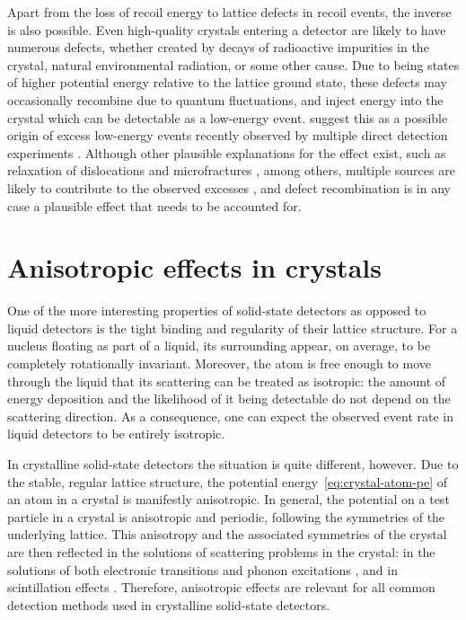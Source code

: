 \documentclass[b5paper, 10pt, twoside]{book}
\begin{document}
Apart from the loss of recoil energy to lattice defects in recoil events, the inverse is also possible. Even high-quality crystals entering a detector are likely to have numerous defects, whether created by decays of radioactive impurities in the crystal, natural environmental radiation, or some other cause. Due to being states of higher potential energy relative to the lattice ground state, these defects may occasionally recombine due to quantum fluctuations, and inject energy into the crystal which can be detectable as a low-energy event. \textcite{NordlundEtAl2024} suggest this as a possible origin of excess low-energy events recently observed by multiple direct detection experiments \parencites{CRESSTIII2019, DAMIC2020, EDELWEISS2020, NUCLEUS2020, SENSEI2020, SuperCDMS2020}. Although other plausible explanations for the effect exist, such as relaxation of dislocations and microfractures \parencites{AnthonyPetersen2024, Romani2024}, among others, multiple sources are likely to contribute to the observed excesses \parencite{AdariEtAl2022}, and defect recombination is in any case a plausible effect that needs to be accounted for.

\section{Anisotropic effects in crystals}

One of the more interesting properties of solid-state detectors as opposed to liquid detectors is the tight binding and regularity of their lattice structure. For a nucleus floating as part of a liquid, its surrounding appear, on average, to be completely rotationally invariant. Moreover, the atom is free enough to move through the liquid that its scattering can be treated as isotropic: the amount of energy deposition and the likelihood of it being detectable do not depend on the scattering direction. As a consequence, one can expect the observed event rate in liquid detectors to be entirely isotropic.

In crystalline solid-state detectors the situation is quite different, however. Due to the stable, regular lattice structure, the potential energy~\eqref{eq:crystal-atom-pe} of an atom in a crystal is manifestly anisotropic. In general, the potential on a test particle in a crystal is anisotropic and periodic, following the symmetries of the underlying lattice. This anisotropy and the associated symmetries of the crystal are then reflected in the solutions of scattering problems in the crystal: in the solutions of both electronic transitions and phonon excitations \parencite{TrickleEtAl2020}, and in scintillation effects \parencite{SekiyaEtAl2003}. Therefore, anisotropic effects are relevant for all common detection methods used in crystalline solid-state detectors.
\end{document}
